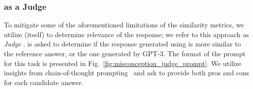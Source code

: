 
\subsubsection{{\DV} as a Judge}
\label{subsubsec:dv3judge}


To mitigate some of the aforementioned limitations of the similarity metrics, we utilize {\DV} (itself) to determine relevance of the response; we refer to this approach as \textit{Judge \DV}. {\DV} is asked to determine if the response generated using {\DV} is more similar to the reference answer, or the one generated by GPT-3. The format of the prompt for this task is presented in Fig.~\ref{fig:misconception_judge_prompt}. We utilize insights from chain-of-thought prompting~\cite{wei2022chain} and ask {\DV} to provide both pros and cons for each candidate answer.

